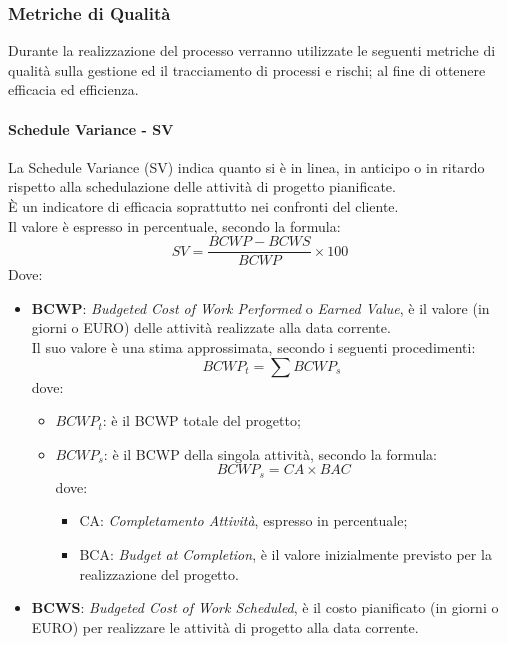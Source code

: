 	 \subsubsection{Metriche di Qualità}
	 Durante la realizzazione del processo verranno utilizzate le seguenti metriche di qualità sulla gestione ed il tracciamento di processi e rischi; al fine di ottenere efficacia ed efficienza.  
	 \paragraph{Schedule Variance - SV}
	 La Schedule Variance (SV) indica quanto si è in linea, in anticipo o in ritardo rispetto alla schedulazione delle attività di progetto pianificate. \\
	 È un indicatore di efficacia soprattutto nei confronti del cliente.\\
	 Il valore è espresso in percentuale, secondo la formula:
	\begin{displaymath}
		SV = \frac{BCWP-BCWS}{BCWP}\times100
	\end{displaymath}
	Dove:

		\begin{itemize}
			\item {\bfseries BCWP}: {\itshape Budgeted Cost of Work Performed} o {\itshape
			Earned Value}, è  il valore (in giorni o EURO) delle attività realizzate alla data corrente.\\
			Il suo valore è una stima approssimata, secondo i seguenti procedimenti:
			\begin{displaymath}
				BCWP_t = \sum BCWP_s
			\end{displaymath}
			dove:
			\begin{itemize}
				\item {\bfseries $BCWP_t$}: è il BCWP totale del progetto;
				\item {\bfseries $BCWP_s$}: è il BCWP della singola attività, secondo la formula:
				\begin{displaymath}
					BCWP_s = CA\times BAC
				\end{displaymath}
			dove:
			\begin{itemize}
				\item  CA: {\itshape Completamento Attività}, espresso in percentuale;
				\item BCA: {\itshape Budget at Completion}, è il valore inizialmente previsto per la realizzazione del progetto.
			\end{itemize}
			\end{itemize}
			\item {\bfseries BCWS}: {\itshape Budgeted Cost of Work Scheduled}, è il costo pianificato (in giorni o EURO) per realizzare le attività di progetto alla data corrente. \\
		\end{itemize} 
		
